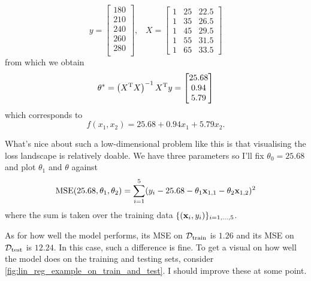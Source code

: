\documentclass[11pt]{article}
\begin{document}
$$
y=
\begin{bmatrix}
    180\\
    210\\
    240\\
    260\\
    280\\
\end{bmatrix},
\hspace{10pt}
X=
\begin{bmatrix}
    1 & 25 & 22.5 \\
    1 & 35 & 26.5 \\
    1 & 45 & 29.5 \\
    1 & 55 & 31.5 \\
    1 & 65 & 33.5
\end{bmatrix}
$$
from which we obtain
$$
\theta^{*}
=
\left(X^{\text{T}}X\right)^{-1}X^{\text{T}}y
=
\begin{bmatrix}
    25.68\\
    0.94\\
    5.79
\end{bmatrix}
$$
which corresponds to
$$
f(x_1,x_2)=25.68+0.94x_1+5.79x_2.
$$

What's nice about such a low-dimensional problem like this is that visualising the loss landscape is relatively doable. We have three parameters so I'll fix $\theta_0=25.68$ and plot $\theta_1$ and $\theta$ against 
$$
\text{MSE}(25.68, \theta_1, \theta_2)
=
\sum_{i=1}^5 (y_i-25.68-\theta_1\mathbf{x}_{1,1}-\theta_2\mathbf{x}_{1,2})^2
$$
where the sum is taken over the training data $\{(\mathbf{x}_i,y_i)\}_{i=1,\dots,5}$.

As for how well the model performs, its MSE on $\mathcal{D}_{\text{train}}$ is $1.26$ and its MSE on $\mathcal{D}_{\text{test}}$ is $12.24$. In this case, such a difference is fine. To get a visual on how well the model does on the training and testing sets, consider \autoref{fig:lin_reg_example_on_train_and_test}. I should improve these at some point.
\end{document}
